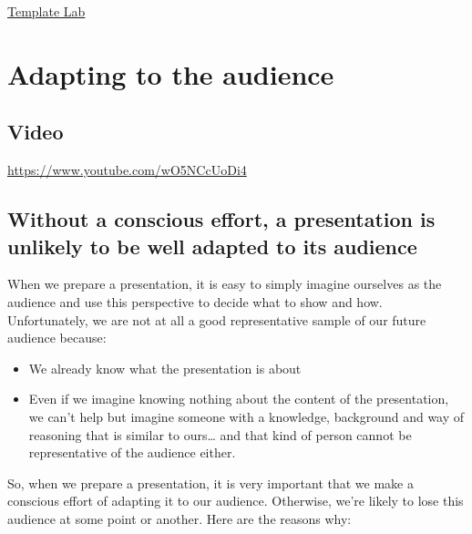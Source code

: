 \documentclass[
]{book}
\providecommand{\tightlist}{%
  \setlength{\itemsep}{0pt}\setlength{\parskip}{0pt}}
\begin{document}
\href{https://templatelab.com/research-posters/}{Template Lab}

\hypertarget{audience1}{%
\chapter{Adapting to the audience}\label{audience1}}

\hypertarget{video-4}{%
\section{Video}\label{video-4}}

\label{fig:unnamed-chunk-32}\url{https://www.youtube.com/wO5NCcUoDi4}

\hypertarget{without-a-conscious-effort-a-presentation-is-unlikely-to-be-well-adapted-to-its-audience}{%
\section{Without a conscious effort, a presentation is unlikely to be well adapted to its audience}\label{without-a-conscious-effort-a-presentation-is-unlikely-to-be-well-adapted-to-its-audience}}

When we prepare a presentation, it is easy to simply imagine ourselves as the audience and use this perspective to decide what to show and how. Unfortunately, we are not at all a good representative sample of our future audience because:

\begin{itemize}
\tightlist
\item
  We already know what the presentation is about
\item
  Even if we imagine knowing nothing about the content of the presentation, we can't help but imagine someone with a knowledge, background and way of reasoning that is similar to ours\ldots{} and that kind of person cannot be representative of the audience either.
\end{itemize}

So, when we prepare a presentation, it is very important that we make a conscious effort of adapting it to our audience. Otherwise, we're likely to lose this audience at some point or another. Here are the reasons why:
\end{document}

